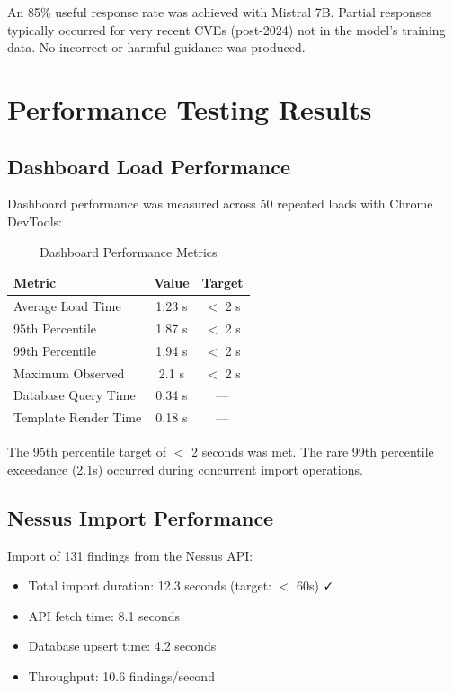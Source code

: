 An 85\% useful response rate was achieved with Mistral 7B. Partial responses typically occurred for very recent CVEs (post-2024) not in the model's training data. No incorrect or harmful guidance was produced.

\section{Performance Testing Results}

\subsection{Dashboard Load Performance}

Dashboard performance was measured across 50 repeated loads with Chrome DevTools:

\begin{table}[H]
\centering
\caption{Dashboard Performance Metrics}
\label{tab:perf}
\begin{tabular}{lcc}
\toprule
\textbf{Metric} & \textbf{Value} & \textbf{Target} \\
\midrule
Average Load Time & 1.23 s & $<$ 2 s \\
95th Percentile & 1.87 s & $<$ 2 s \\
99th Percentile & 1.94 s & $<$ 2 s \\
Maximum Observed & 2.1 s & $<$ 2 s \\
Database Query Time & 0.34 s & --- \\
Template Render Time & 0.18 s & --- \\
\bottomrule
\end{tabular}
\end{table}

The 95th percentile target of $<$ 2 seconds was met. The rare 99th percentile exceedance (2.1s) occurred during concurrent import operations.

\subsection{Nessus Import Performance}

Import of 131 findings from the Nessus API:
\begin{itemize}
  \item Total import duration: 12.3 seconds (target: $<$ 60s) ✓
  \item API fetch time: 8.1 seconds
  \item Database upsert time: 4.2 seconds
  \item Throughput: 10.6 findings/second
\end{itemize}

